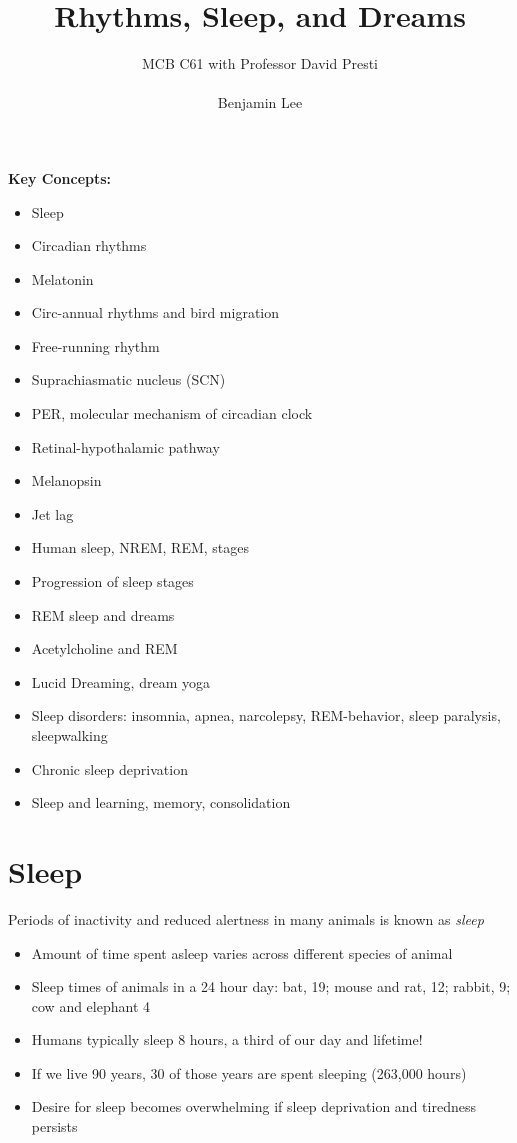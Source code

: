 \documentclass{article}
\title{Rhythms, Sleep, and Dreams}
\author{MCB C61 with Professor David Presti \\ \\ Benjamin Lee}
\begin{document}
\maketitle

\textbf{Key Concepts:}
\begin{itemize}
    \item Sleep 
    \item Circadian rhythms
    \item Melatonin
    \item Circ-annual rhythms and bird migration
    \item Free-running rhythm
    \item Suprachiasmatic nucleus (SCN)
    \item PER, molecular mechanism of circadian clock
    \item Retinal-hypothalamic pathway
    \item Melanopsin 
    \item Jet lag
    \item Human sleep, NREM, REM, stages
    \item Progression of sleep stages
    \item REM sleep and dreams
    \item Acetylcholine and REM
    \item Lucid Dreaming, dream yoga
    \item Sleep disorders: insomnia, apnea, narcolepsy, REM-behavior, sleep paralysis, sleepwalking
    \item Chronic sleep deprivation
    \item Sleep and learning, memory, consolidation
\end{itemize}

\newpage
\section{Sleep}
Periods of inactivity and reduced alertness in many animals is known as \textit{sleep} 

\begin{itemize}
    \item Amount of time spent asleep varies across different species of animal
    \item Sleep times of animals in a 24 hour day: bat, 19; mouse and rat, 12; rabbit, 9; cow and elephant 4
    \item Humans typically sleep 8 hours, a third of our day and lifetime!
    \item If we live 90 years, 30 of those years are spent sleeping (263,000 hours) 
    \item Desire for sleep becomes overwhelming if sleep deprivation and tiredness persists
\end{itemize}
\end{document}
